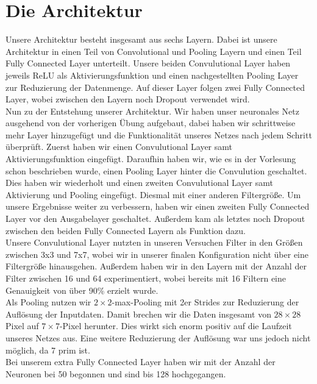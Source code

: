 \documentclass[10pt,journal,compsoc]{IEEEtran}
\begin{document}
\section{Die Architektur}
Unsere Architektur besteht insgesamt aus sechs Layern.
Dabei ist unsere Architektur in einen Teil von Convolutional und Pooling Layern und einen Teil Fully Connected Layer unterteilt. Unsere beiden Convulutional Layer haben jeweils ReLU als Aktivierungsfunktion und einen nachgestellten Pooling Layer zur Reduzierung der Datenmenge. Auf dieser Layer folgen zwei Fully Connected Layer, wobei zwischen den Layern noch Dropout verwendet wird.\\

\noindent Nun zu der Entstehung unserer Architektur. Wir haben unser neuronales Netz ausgehend von der vorherigen Übung aufgebaut, dabei haben wir schrittweise mehr Layer hinzugefügt und die Funktionalität unseres Netzes nach jedem Schritt überprüft. Zuerst haben wir einen Convulutional Layer samt Aktivierungsfunktion eingefügt. Daraufhin haben wir, wie es in der Vorlesung schon beschrieben wurde, einen Pooling Layer hinter die Convulution geschaltet. Dies haben wir wiederholt und einen zweiten Convulutional Layer samt Aktivierung und Pooling eingefügt. Diesmal mit einer anderen Filtergröße. Um unsere Ergebnisse weiter zu verbessern, haben wir einen zweiten Fully Connected Layer vor den Ausgabelayer geschaltet. Außerdem kam als letztes noch Dropout zwischen den beiden Fully Connected Layern als Funktion dazu.\\

\noindent Unsere Convulutional Layer nutzten in unseren Versuchen Filter in den Größen zwischen 3x3 und 7x7, wobei wir in unserer finalen Konfiguration nicht über eine Filtergröße hinausgehen. Außerdem haben wir in den Layern mit der Anzahl der Filter zwischen 16 und 64 experimentiert, wobei bereits mit 16 Filtern eine Genauigkeit von über 90\% erzielt wurde.\\

\noindent Als Pooling nutzen wir $2\times 2$-max-Pooling mit 2er Strides zur Reduzierung der Auflösung der Inputdaten. Damit brechen wir die Daten insgesamt von $28\times 28$ Pixel auf $7\times 7$-Pixel herunter. Dies wirkt sich enorm positiv auf die Laufzeit unseres Netzes aus. Eine weitere Reduzierung der Auflösung war uns jedoch nicht möglich, da 7 prim ist.\\

\noindent Bei unserem extra Fully Connected Layer haben wir mit der Anzahl der Neuronen bei 50 begonnen und sind bis 128 hochgegangen.
\end{document}
